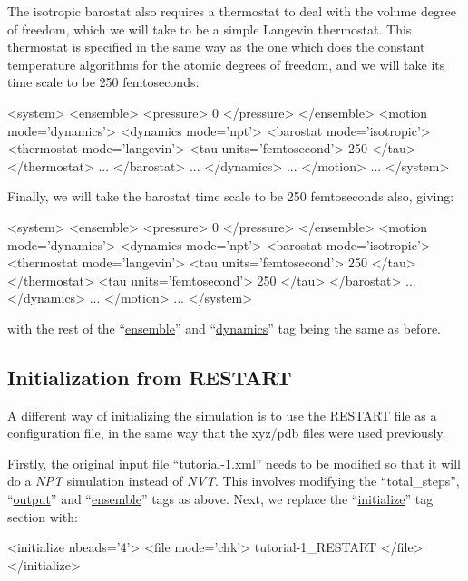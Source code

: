 \documentclass[11pt,english,fleqn]{report}
\newenvironment{code}{%
\footnotesize 
\verbatim
}{
\endverbatim
\normalsize
}
\begin{document}
The isotropic barostat also requires a thermostat
to deal with the volume degree of freedom, which we will take
to be a simple Langevin thermostat.
This thermostat is specified in the same way as the one which does the
constant temperature algorithms for the atomic degrees of freedom, and
we will take its time scale to be 250 femtoseconds:

\begin{code}
<system>
   <ensemble>
      <pressure> 0 </pressure>
   </ensemble>
   <motion mode='dynamics'>
      <dynamics mode='npt'>
         <barostat mode='isotropic'>
            <thermostat mode='langevin'>
               <tau units='femtosecond'> 250 </tau>
            </thermostat>
            ...
         </barostat>
         ...
      </dynamics>
      ...
   </motion>
   ...
</system>
\end{code}

Finally, we will take the barostat time scale to be 250 femtoseconds also, giving:

\begin{code}
<system>
   <ensemble>
      <pressure> 0 </pressure>
   </ensemble>
   <motion mode='dynamics'>
      <dynamics mode='npt'>
         <barostat mode='isotropic'>
            <thermostat mode='langevin'>
               <tau units='femtosecond'> 250 </tau>
            </thermostat>
            <tau units='femtosecond'> 250 </tau>
         </barostat>
         ...
      </dynamics>
      ...
   </motion>
   ...
</system>
\end{code}
with the rest of the {}``\hyperref[ENSEMBLE]{ensemble}'' and
{}``\hyperref[DYNAMICS]{dynamics}'' tag being the same as before.

\subsection{Initialization from RESTART}

A different way of initializing the simulation is to use the 
RESTART file as a configuration file, in the same way that
the xyz/pdb files were used previously.

Firstly, the original input file {}``tutorial-1.xml'' needs to
be modified so that
it will do a \emph{NPT} simulation instead of \emph{NVT}. This involves modifying
the {}``total\_steps'', {}``\hyperref[OUTPUTS]{output}'' and 
{}``\hyperref[ENSEMBLE]{ensemble}'' tags as above. Next, we replace the 
{}``\hyperref[INITIALIZER]{initialize}'' tag section with:

\begin{code}
<initialize nbeads='4'>
   <file mode='chk'> tutorial-1_RESTART </file>
</initialize>
\end{code}
\end{document}
